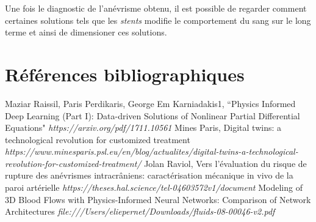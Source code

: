 \documentclass{article}
\begin{document}
Une fois le diagnostic de l'anévrisme obtenu, il est possible de regarder comment certaines solutions tels que les \emph{stents} modifie le comportement du sang sur le long terme et ainsi de dimensioner ces solutions.

	\section{Références bibliographiques}
	
	\begin{thebibliography}{2} %

	\bibitem{} Maziar Raissil, Paris Perdikaris, George Em Karniadakis1, ``Physics Informed Deep Learning (Part I): Data-driven Solutions of Nonlinear Partial Differential Equations" \emph{https://arxiv.org/pdf/1711.10561}
	\bibitem{} Mines Paris, Digital twins: a technological revolution for customized treatment \emph{https://www.minesparis.psl.eu/en/blog/actualites/digital-twins-a-technological-revolution-for-customized-treatment/}
	\bibitem{} Jolan Raviol, Vers l’évaluation du risque de rupture des anévrismes intracrâniens: caractérisation mécanique in vivo de la paroi artérielle \emph{https://theses.hal.science/tel-04603572v1/document}
	\bibitem{} Modeling of 3D Blood Flows with Physics-Informed Neural
Networks: Comparison of Network Architectures \emph{file:///Users/eliepernet/Downloads/fluids-08-00046-v2.pdf}
\end{thebibliography}
\end{document}
